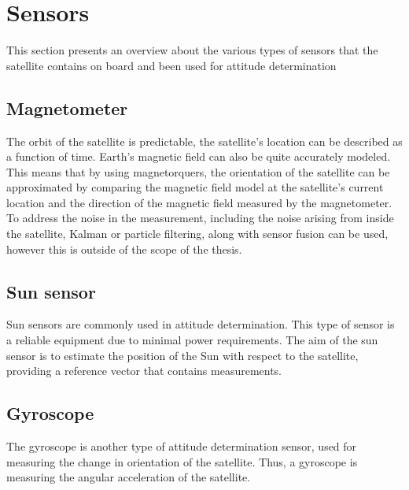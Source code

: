 \section{Sensors}
This section presents an overview about the various types of sensors that the satellite contains on board and been used for attitude determination
\subsection{Magnetometer}

The orbit of the satellite is predictable, the satellite's location can be described as a function of time. Earth's magnetic field can also be quite accurately modeled. This means that by using magnetorquers, the orientation of the satellite can be approximated by comparing the magnetic field model at the satellite's current location and the direction of the magnetic field measured by the magnetometer. To address the noise in the measurement, including the noise arising from inside the satellite, Kalman or particle filtering, along with sensor fusion can be used, however this is outside of the scope of the thesis.

%

\subsection{Sun sensor}
Sun sensors are commonly used in attitude determination. This type of sensor is a reliable equipment due to minimal power requirements. The aim of the sun sensor is to estimate the position of the Sun with respect to the satellite, providing a reference vector that contains measurements.

\subsection{Gyroscope}
The gyroscope is another type of attitude determination sensor, used for measuring the change in orientation of the satellite. Thus, a gyroscope is measuring the angular acceleration of the satellite.

